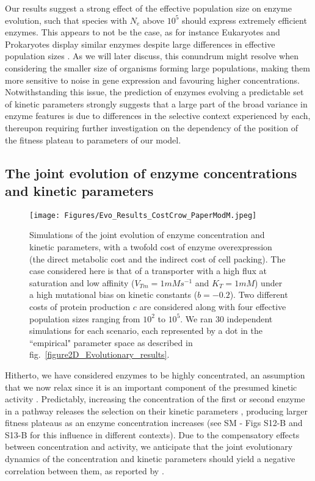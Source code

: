 \documentclass[11pt,onecolumn]{article}
\begin{document}
Our results suggest a strong effect of the effective population size on enzyme evolution, such that species with $N_e$ above $10^5$ \citep[most unicellular organisms]{Bobay18} should express extremely efficient enzymes. This appears to not be the case, as for instance Eukaryotes and Prokaryotes display similar enzymes despite large differences in effective population sizes \citep{Bar-Even11}. As we will later discuss, this conundrum might resolve when considering the smaller size of organisms forming large populations, making them more sensitive to noise in gene expression and favouring higher concentrations. 
Notwithstanding this issue, the prediction of enzymes evolving a predictable set of kinetic parameters strongly suggests that a large part of the broad variance in enzyme features is due to differences in the selective context experienced by each, thereupon requiring further investigation on the dependency of the position of the fitness plateau to parameters of our model.

\subsection{The joint evolution of enzyme concentrations and kinetic parameters}

\begin{figure}[h!]
\centering
\texttt{[image: Figures/Evo\_Results\_CostCrow\_PaperModM.jpeg]}
\caption{Simulations of the joint evolution of enzyme concentration and kinetic parameters, with a twofold cost of enzyme overexpression (the direct metabolic cost and the indirect cost of cell packing). The case considered here is that of a transporter with a high flux at saturation and low affinity ($V_{Tm}=1 mMs^{-1}$ and $K_T=1mM$) under a high mutational bias on kinetic constants ($b=-0.2$). Two different costs of protein production $c$ are considered along with four effective population sizes ranging from $10^2$ to $10^5$. We ran 30 independent simulations for each scenario, each represented by a dot in the ``empirical" parameter space as described in fig.~\ref{figure2D_Evolutionary_results}.
}
\label{figure2D_Evolutionary_results_HF}
\end{figure}

Hitherto, we have considered enzymes to be highly concentrated, an assumption that we now relax since it is an important component of the presumed kinetic activity \citep{Koshland02}. Predictably, increasing the concentration of the first or second enzyme in a pathway releases the selection on their kinetic parameters \citep{Noor16}, producing larger fitness plateaus as an enzyme concentration increases (see SM - Figs S12-B and S13-B for this influence in different contexts). Due to the compensatory effects between concentration and activity, we anticipate that the joint evolutionary dynamics of the concentration and kinetic parameters should yield a negative correlation between them, as reported by \citet{Davidi16,Davidi18}. 
\end{document}
